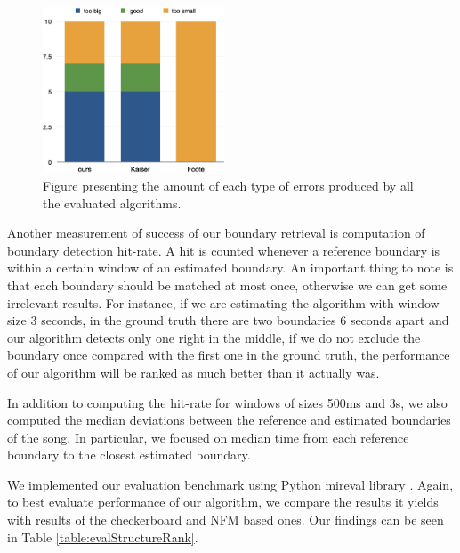 \begin{figure}
\vspace{-10pt}
  \begin{center}
    \includegraphics[width=0.48\textwidth]{Figures/count}
  \end{center}
  \caption{Figure presenting the amount of each type of errors produced by all the evaluated algorithms.}
\label{fig:boundcount}
\end{figure}

Another measurement of success of our boundary retrieval is computation of boundary detection hit-rate. A hit is counted whenever a reference boundary is within a certain window of an estimated boundary. An important thing to note is that each boundary should be matched at most once, otherwise we can get some irrelevant results. For instance, if we are estimating the algorithm with window size 3 seconds, in the ground truth there are two boundaries 6 seconds apart and our algorithm detects only one right in the middle, if we do not exclude the boundary once compared with the first one in the ground truth, the performance of our algorithm will be ranked as much better than it actually was. 


In addition to computing the hit-rate for windows of sizes 500ms and 3s, we also computed the median deviations between the reference and estimated boundaries of the song. In particular, we focused on median time from each reference boundary to the closest estimated boundary.

We implemented our evaluation benchmark using Python mir\textunderscore eval library \cite{mireval}.
Again, to best evaluate performance of our algorithm, we compare the results it yields with results of the checkerboard and NFM based ones. Our findings can be seen in Table \ref{table:evalStructureRank}.


